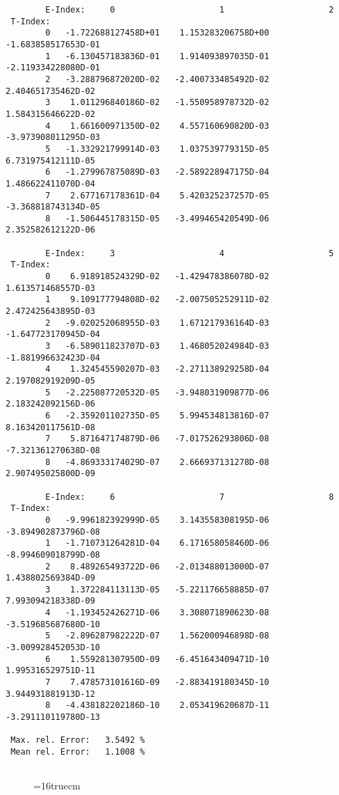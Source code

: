 \documentclass[12pt,dvipdfmx]{article}
\begin{document}
\begin{small}\begin{verbatim}
        E-Index:     0                     1                     2
 T-Index:
        0   -1.722688127458D+01    1.153283206758D+00   -1.683858517653D-01
        1   -6.130457183836D-01    1.914093897035D-01   -2.119334228080D-01
        2   -3.288796872020D-02   -2.400733485492D-02    2.404651735462D-02
        3    1.011296840186D-02   -1.550958978732D-02    1.584315646622D-02
        4    1.661600971350D-02    4.557160690820D-03   -3.973908011295D-03
        5   -1.332921799914D-03    1.037539779315D-05    6.731975412111D-05
        6   -1.279967875089D-03   -2.589228947175D-04    1.486622411070D-04
        7    2.677167178361D-04    5.420325237257D-05   -3.368818743134D-05
        8   -1.506445178315D-05   -3.499465420549D-06    2.352582612122D-06

        E-Index:     3                     4                     5
 T-Index:
        0    6.918918524329D-02   -1.429478386078D-02    1.613571468557D-03
        1    9.109177794808D-02   -2.007505252911D-02    2.472425643895D-03
        2   -9.020252068955D-03    1.671217936164D-03   -1.647723170945D-04
        3   -6.589011823707D-03    1.468052024984D-03   -1.881996632423D-04
        4    1.324545590207D-03   -2.271138929258D-04    2.197082919209D-05
        5   -2.225087720532D-05   -3.948031909877D-06    2.183242092156D-06
        6   -2.359201102735D-05    5.994534813816D-07    8.163420117561D-08
        7    5.871647174879D-06   -7.017526293806D-08   -7.321361270638D-08
        8   -4.869333174029D-07    2.666937131278D-08    2.907495025800D-09

        E-Index:     6                     7                     8
 T-Index:
        0   -9.996182392999D-05    3.143558308195D-06   -3.894902873796D-08
        1   -1.710731264281D-04    6.171658058460D-06   -8.994609018799D-08
        2    8.489265493722D-06   -2.013488013000D-07    1.438802569384D-09
        3    1.372284113113D-05   -5.221176658885D-07    7.993094218338D-09
        4   -1.193452426271D-06    3.308071890623D-08   -3.519685687680D-10
        5   -2.896287982222D-07    1.562000946898D-08   -3.009928452053D-10
        6    1.559281307950D-09   -6.451643409471D-10    1.995316529751D-11
        7    7.478573101616D-09   -2.883419180345D-10    3.944931881913D-12
        8   -4.438182202186D-10    2.053419620687D-11   -3.291110119780D-13

 Max. rel. Error:   3.5492 %
 Mean rel. Error:   1.1008 %


\end{verbatim}\end{small}
\begin{figure} \label{2.2.14a}
\epsfxsize=16truecm
\end{figure}
\newpage
\end{document}
